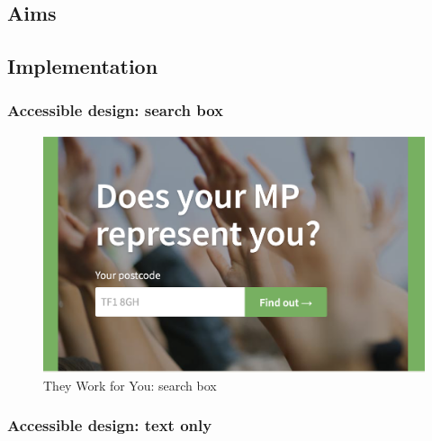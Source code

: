 \documentclass{article}
\begin{document}
        \subsection*{Aims}
        
        
        \subsection*{Implementation}
        
        	\subsubsection*{Accessible design: search box}
        	

			\begin{figure}[h]
				\centering
				\includegraphics[scale=0.5]{images/they-work-for-you-implementation-search-box}
				\caption{They Work for You: search box}
				\label{fig:they-work-for-you-implementation-search-box}
			\end{figure}
        	
        	\subsubsection*{Accessible design: text only}
        	
\end{document}
